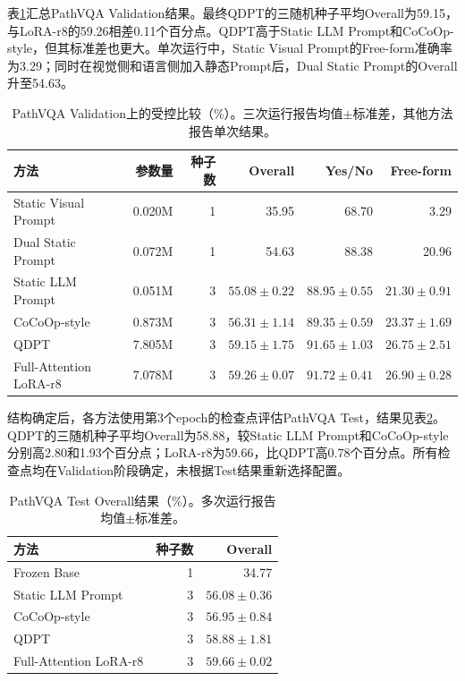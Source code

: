 表\ref{tab:pathvqa-main}汇总PathVQA Validation结果。最终QDPT的三随机种子平均Overall为59.15，与LoRA-r8的59.26相差0.11个百分点。QDPT高于Static LLM Prompt和CoCoOp-style，但其标准差也更大。单次运行中，Static Visual Prompt的Free-form准确率为3.29；同时在视觉侧和语言侧加入静态Prompt后，Dual Static Prompt的Overall升至54.63。

\begin{table}[t]
    \centering
    \caption{PathVQA Validation上的受控比较（\%）。三次运行报告均值$\pm$标准差，其他方法报告单次结果。}
    \label{tab:pathvqa-main}
    \scriptsize
    \setlength{\tabcolsep}{2pt}
    \begin{tabular}{@{}lrrrrr@{}}
        \toprule
        方法 & 参数量 & 种子数 & Overall & Yes/No & Free-form \\
        \midrule
        Static Visual Prompt & 0.020M & 1 & 35.95 & 68.70 & 3.29 \\
        Dual Static Prompt & 0.072M & 1 & 54.63 & 88.38 & 20.96 \\
        Static LLM Prompt & 0.051M & 3 & $55.08\pm0.22$ & $88.95\pm0.55$ & $21.30\pm0.91$ \\
        CoCoOp-style & 0.873M & 3 & $56.31\pm1.14$ & $89.35\pm0.59$ & $23.37\pm1.69$ \\
        QDPT & 7.805M & 3 & $59.15\pm1.75$ & $91.65\pm1.03$ & $26.75\pm2.51$ \\
        \midrule
        Full-Attention LoRA-r8 & 7.078M & 3 & $59.26\pm0.07$ & $91.72\pm0.41$ & $26.90\pm0.28$ \\
        \bottomrule
    \end{tabular}
\end{table}

结构确定后，各方法使用第3个epoch的检查点评估PathVQA Test，结果见表\ref{tab:pathvqa-test}。QDPT的三随机种子平均Overall为58.88，较Static LLM Prompt和CoCoOp-style分别高2.80和1.93个百分点；LoRA-r8为59.66，比QDPT高0.78个百分点。所有检查点均在Validation阶段确定，未根据Test结果重新选择配置。

\begin{table}[t]
    \centering
    \caption{PathVQA Test Overall结果（\%）。多次运行报告均值$\pm$标准差。}
    \label{tab:pathvqa-test}
    \scriptsize
    \begin{tabular}{@{}lrr@{}}
        \toprule
        方法 & 种子数 & Overall \\
        \midrule
        Frozen Base & 1 & 34.77 \\
        Static LLM Prompt & 3 & $56.08\pm0.36$ \\
        CoCoOp-style & 3 & $56.95\pm0.84$ \\
        QDPT & 3 & $58.88\pm1.81$ \\
        Full-Attention LoRA-r8 & 3 & $59.66\pm0.02$ \\
        \bottomrule
    \end{tabular}
\end{table}

